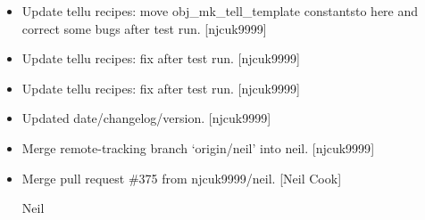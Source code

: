 \documentclass[a4paper,10pt,english]{report}
\begin{document}
\begin{itemize}
\item {} 
Update tellu recipes: move obj\_mk\_tell\_template constantsto here and
correct some bugs after test run. {[}njcuk9999{]}

\item {} 
Update tellu recipes: fix after test run. {[}njcuk9999{]}

\item {} 
Update tellu recipes: fix after test run. {[}njcuk9999{]}

\item {} 
Updated date/changelog/version. {[}njcuk9999{]}

\item {} 
Merge remote-tracking branch ‘origin/neil’ into neil. {[}njcuk9999{]}

\item {} 
Merge pull request \#375 from njcuk9999/neil. {[}Neil Cook{]}

Neil

\end{itemize}
\end{document}
